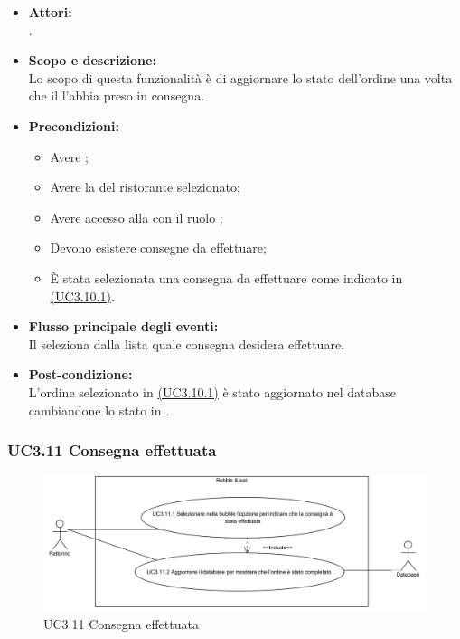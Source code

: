\begin{itemize}
	\item \textbf{Attori:}
	\\.
	\item \textbf{Scopo e descrizione:} 
	\\Lo scopo di questa funzionalità è di aggiornare lo stato dell'ordine una volta che il  l'abbia preso in consegna.
	\item \textbf{Precondizioni:}
	\begin{itemize}
		\item Avere ;
		\item Avere la  del ristorante selezionato;
		\item Avere accesso alla  con il ruolo ;
		\item Devono esistere consegne da effettuare;
		\item È stata selezionata una consegna da effettuare come indicato in \hyperref[UC3.10.1]{(UC3.10.1)}.
	\end{itemize}
	\item \textbf{Flusso principale degli eventi:}
	\\Il {} seleziona dalla lista quale consegna desidera effettuare.
	\item \textbf{Post-condizione:}
	\\L'ordine selezionato in \hyperref[UC3.10.1]{(UC3.10.1)} è stato aggiornato nel database cambiandone lo stato in .
\end{itemize}

\subsubsection{UC3.11 Consegna effettuata} \label{UC3.11}

\begin{figure}[H]
	\centering
	\includegraphics[width=15cm]{../../documenti/AnalisiDeiRequisiti/Diagrammi_img/uc3_11.png}
	\caption{UC3.11 Consegna effettuata}
\end{figure}

